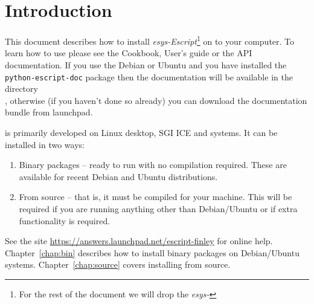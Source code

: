 %
%
%

\chapter{Introduction}
This document describes how to install \emph{esys-Escript}\footnote{For the rest of the document we will drop the \emph{esys-}} on to your computer.
To learn how to use \esfinley please see the Cookbook, User's guide or the API documentation.
If you use the Debian or Ubuntu and you have installed the \texttt{python-escript-doc} package then the documentation 
will be available in the directory\\
, otherwise (if you haven't done so already) you can download the documentation bundle 
from launchpad.



\esfinley is primarily developed on Linux desktop, SGI ICE and \macosx systems.
It can be installed in two ways:
\begin{enumerate}
  \item Binary packages -- ready to run with no compilation required. These are available for recent Debian and Ubuntu distributions.
  \item From source -- that is, it must be compiled for your machine.
  This will be required if you are running anything other than Debian/Ubuntu 
  or if extra functionality is required.
\end{enumerate}

See the site \url{https://answers.launchpad.net/escript-finley} for online help.
Chapter~\ref{chap:bin} describes how to install binary packages on Debian/Ubuntu systems.
Chapter~\ref{chap:source} covers installing from source.



